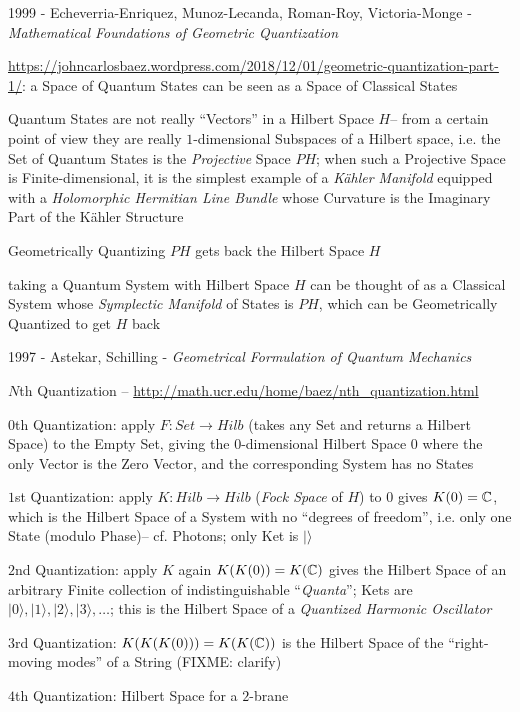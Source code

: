 1999 - Echeverria-Enriquez, Munoz-Lecanda, Roman-Roy, Victoria-Monge -
\emph{Mathematical Foundations of Geometric Quantization}

\url{https://johncarlosbaez.wordpress.com/2018/12/01/geometric-quantization-part-1/}:
a Space of Quantum States can be seen as a Space of Classical States

Quantum States are not really ``Vectors'' in a Hilbert Space $H$-- from a
certain point of view they are really $1$-dimensional Subspaces of a Hilbert
space, i.e. the Set of Quantum States is the \emph{Projective} Space $P H$; when
such a Projective Space is Finite-dimensional, it is the simplest example of a
\emph{K\"ahler Manifold} equipped with a \emph{Holomorphic Hermitian Line
  Bundle} whose Curvature is the Imaginary Part of the K\"ahler Structure

Geometrically Quantizing $PH$ gets back the Hilbert Space $H$

taking a Quantum System with Hilbert Space $H$ can be thought of as a Classical
System whose \emph{Symplectic Manifold} of States is $P H$, which can be
Geometrically Quantized to get $H$ back

1997 - Astekar, Schilling - \emph{Geometrical Formulation of Quantum Mechanics}

$N$th Quantization -- \url{http://math.ucr.edu/home/baez/nth_quantization.html}

$0$th Quantization: apply $F : Set \rightarrow Hilb$ (takes any Set and returns
a Hilbert Space) to the Empty Set, giving the $0$-dimensional Hilbert Space
$\xspace{0}$ where the only Vector is the Zero Vector, and the corresponding
System has no States

$1$st Quantization: apply $K : Hilb \rightarrow Hilb$ (\emph{Fock Space} of $H$)
to $\xspace{0}$ gives $K({0}) = \mathbb{C}$, which is the Hilbert Space of a
System with no ``degrees of freedom'', i.e. only one State (modulo Phase)-- cf.
Photons; only Ket is $|\rangle$

$2$nd Quantization: apply $K$ again $K(K({0})) = K(\mathbb{C})$ gives the
Hilbert Space of an arbitrary Finite collection of indistinguishable
``\emph{Quanta}''; Kets are $|0\rangle, |1\rangle, |2\rangle, |3\rangle,
\ldots$; this is the Hilbert Space of a \emph{Quantized Harmonic Oscillator}

$3$rd Quantization: $K(K(K({0}))) = K(K(\mathbb{C}))$ is the Hilbert Space of
the ``right-moving modes'' of a String (FIXME: clarify)

$4$th Quantization: Hilbert Space for a $2$-brane

